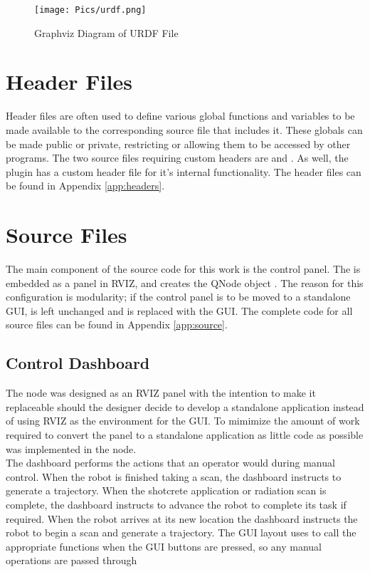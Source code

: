 \begin{figure}[h]
    \centering
    \texttt{[image: Pics/urdf.png]}
    \caption{Graphviz Diagram of URDF File}
    \label{fig:urdf}
\end{figure}

\section{Header Files}
Header files are often used to define various global functions and variables to be made available to the corresponding source file that includes it. These globals can be made public or private, restricting or allowing them to be accessed by other programs. The two source files requiring custom headers are  and . As well, the  plugin has a custom header file for it's internal functionality. The header files can be found in Appendix \ref{app:headers}.\\

\section{Source Files}
The main component of the source code for this work is the control panel. The  is embedded as a panel in RVIZ, and creates the QNode object . The reason for this configuration is modularity; if the control panel is to be moved to a standalone GUI,  is left unchanged and  is replaced with the GUI. The complete code for all source files can be found in Appendix \ref{app:source}.
\subsection{Control Dashboard}
The  node was designed as an RVIZ panel with the intention to make it replaceable should the designer decide to develop a standalone application instead of using RVIZ as the environment for the GUI. To mimimize the amount of work required to convert the panel to a standalone application as little code as possible was implemented in the node.\\
The dashboard performs the actions that an operator would during manual control. When the robot is finished taking a scan, the dashboard instructs  to generate a trajectory. When the shotcrete application or radiation scan is complete, the dashboard instructs  to advance the robot to complete its task if required. When the robot arrives at its new location the dashboard instructs the robot to begin a scan and generate a trajectory. The GUI layout uses  to call the appropriate  functions when the GUI buttons are pressed, so any manual operations are passed through \\
